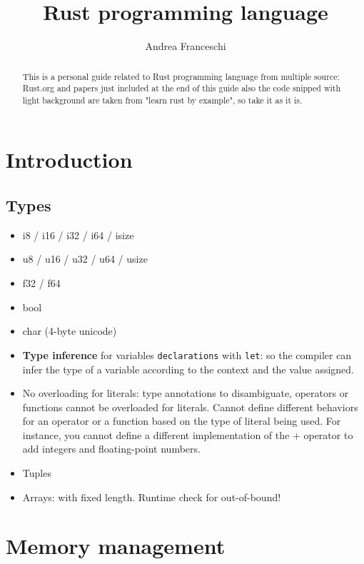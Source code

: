 \documentclass{article}
\title{Rust programming language}
\author{Andrea Franceschi}
\begin{document}
\maketitle

\begin{abstract}
This is a personal guide related to Rust programming language from multiple source: Rust.org and papers just included at the end of this guide also the code snipped with light background are taken from "learn rust by example", so take it as it is.
\end{abstract}

\section{Introduction}
\subsection{Types}
\begin{itemize}
    \item i8 / i16 / i32 / i64 / isize
    \item u8 / u16 / u32 / u64 / usize
    \item f32 / f64
    \item bool
    \item char (4-byte unicode)
    \item \textbf{Type inference} for variables \texttt{declarations} with \texttt{let}: so the compiler can infer the type of a variable according to the context and the value assigned.
    \item No overloading for literals: type annotations to disambiguate, operators or functions cannot be overloaded for literals. Cannot define different behaviors for an operator or a function based on the type of literal being used. For instance, you cannot define a different implementation of the + operator to add integers and floating-point numbers.
    \item Tuples
    \item Arrays: with fixed length. Runtime check for out-of-bound!
\end{itemize}
\section{Memory management}
\end{document}
